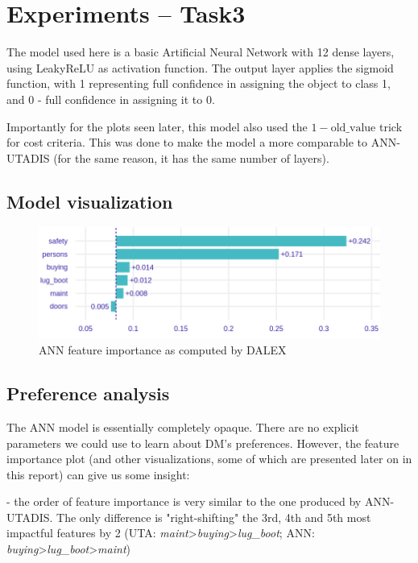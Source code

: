 \documentclass[../main.tex]{subfiles}
\begin{document}
\section{Experiments -- Task3}

The model used here is a basic Artificial Neural Network with 12 dense layers,
using LeakyReLU as activation function. The output layer applies the sigmoid
function, with 1 representing full confidence in assigning the object to class 1, and 0
- full confidence in assigning it to 0.

Importantly for the plots seen later, this model also used the
$1-\mathrm{old\_value}$ trick for cost criteria. This was done to make the model
a more comparable to ANN-UTADIS (for the same reason, it has the same number of layers).

\subsection{Model visualization}
\begin{figure}[H]
    \centering
    \includegraphics[width=\linewidth]{../img/ANN-feature-importance.png}
    \caption{ANN feature importance as computed by DALEX}
    \label{fig:ANN-feats}
\end{figure}

\subsection{Preference analysis}

The ANN model is essentially completely opaque. There are no explicit parameters
we could use to learn about DM's preferences.
However, the feature importance plot (and other visualizations, some of which are presented
later on in this report) can give us some insight:

- the order of feature importance is very similar to the one produced by ANN-UTADIS.
The only difference is "right-shifting" the 3rd, 4th and 5th most impactful features by 2
(UTA: \emph{maint}>\emph{buying}>\emph{lug\_boot}; ANN: \emph{buying}>\emph{lug\_boot}>\emph{maint})
\end{document}
